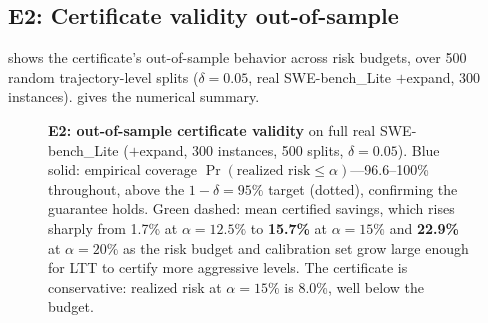 \documentclass[11pt]{article}
\begin{document}
\subsection{E2: Certificate validity out-of-sample}
\label{sec:e2}

 shows the certificate's out-of-sample behavior across
risk budgets, over 500 random trajectory-level splits ($\delta=0.05$, real
SWE-bench\_Lite $+$expand, 300 instances).  gives the numerical
summary.

\begin{figure}[t]
\centering
{}
\caption{\textbf{E2: out-of-sample certificate validity} on full real SWE-bench\_Lite
($+$expand, 300 instances, 500 splits, $\delta=0.05$). Blue solid: empirical coverage
$\Pr(\text{realized risk}\le\alpha)$---96.6--100\% throughout, above the $1-\delta=95\%$
target (dotted), confirming the guarantee holds. Green dashed: mean certified savings,
which rises sharply from 1.7\% at $\alpha=12.5\%$ to \textbf{15.7\%} at $\alpha=15\%$
and \textbf{22.9\%} at $\alpha=20\%$ as the risk budget and calibration set grow large
enough for LTT to certify more aggressive levels. The certificate is conservative:
realized risk at $\alpha=15\%$ is 8.0\%, well below the budget.}
\label{fig:alpha_tradeoff}
\end{figure}
\end{document}
